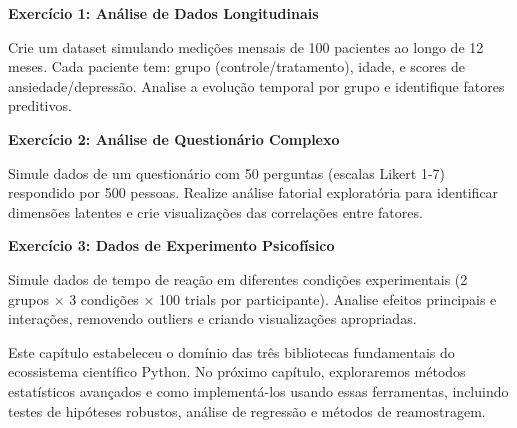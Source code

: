 \begin{examplebox}
\textbf{Exercício 1: Análise de Dados Longitudinais}

Crie um dataset simulando medições mensais de 100 pacientes ao longo de 12 meses. Cada paciente tem: grupo (controle/tratamento), idade, e scores de ansiedade/depressão. Analise a evolução temporal por grupo e identifique fatores preditivos.

\textbf{Exercício 2: Análise de Questionário Complexo}

Simule dados de um questionário com 50 perguntas (escalas Likert 1-7) respondido por 500 pessoas. Realize análise fatorial exploratória para identificar dimensões latentes e crie visualizações das correlações entre fatores.

\textbf{Exercício 3: Dados de Experimento Psicofísico}

Simule dados de tempo de reação em diferentes condições experimentais (2 grupos × 3 condições × 100 trials por participante). Analise efeitos principais e interações, removendo outliers e criando visualizações apropriadas.
\end{examplebox}

Este capítulo estabeleceu o domínio das três bibliotecas fundamentais do ecossistema científico Python. No próximo capítulo, exploraremos métodos estatísticos avançados e como implementá-los usando essas ferramentas, incluindo testes de hipóteses robustos, análise de regressão e métodos de reamostragem.
